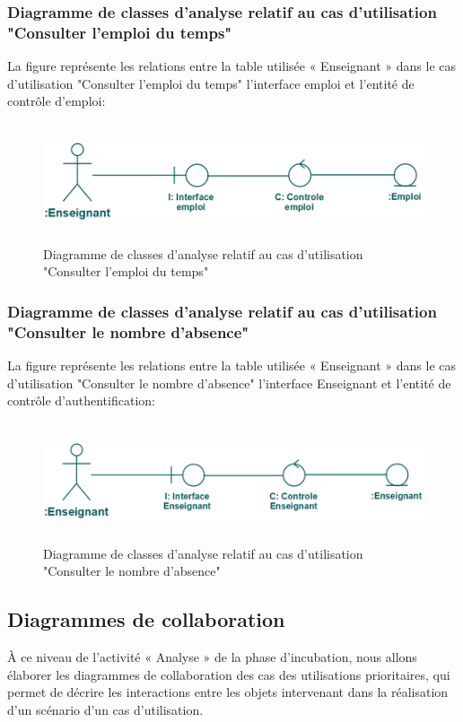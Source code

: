 \documentclass[12 pt]{report}
\begin{document}
\subsubsection{Diagramme de classes d’analyse relatif au cas d’utilisation  "Consulter l'emploi du temps" }
La figure  représente les relations entre la table utilisée « Enseignant » dans le cas d’utilisation "Consulter l'emploi du temps" l’interface  emploi et  l'entité de  contrôle d'emploi:
\begin{figure}[h]
\begin{center}
\includegraphics[width= 12cm , height =3.5cm]{tet.png}
\caption{Diagramme de classes d’analyse relatif au cas d’utilisation "Consulter l'emploi du temps"}
\end{center}
\end{figure}
\subsubsection{Diagramme de classes d’analyse relatif au cas d’utilisation  "Consulter le nombre d'absence" }
La figure  représente les relations entre la table utilisée « Enseignant » dans le cas d’utilisation "Consulter le nombre d'absence" l’interface  Enseignant et  l'entité de  contrôle d'authentification:
\begin{figure}[h]
\begin{center}
\includegraphics[width= 12cm , height =3.5cm]{ccna.png}
\caption{Diagramme de classes d’analyse relatif au cas d’utilisation "Consulter le nombre d'absence"}
\end{center}
\end{figure}
\subsection{Diagrammes de collaboration }
 À ce niveau de l’activité « Analyse » de la phase d’incubation, nous allons élaborer les diagrammes de collaboration des cas des utilisations prioritaires, qui permet de décrire les interactions entre les
objets intervenant dans la réalisation d’un scénario d’un cas d’utilisation.
\end{document}
